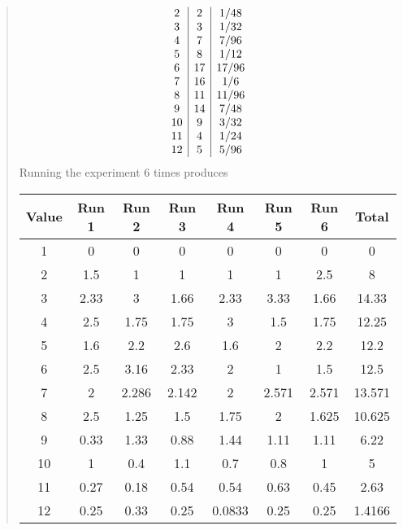 \documentclass{hw}
\begin{document}
\begin{enumerate}
\begin{quote}
\[\begin{array}{c | c | c}
2 & 2 & {1/48}\\

3 & 3 & {1/32}\\

4 & 7 & {7/96}\\

5 & 8 & {1/12}\\

6 & 17 & {17/96}\\

7 & 16 & {1/6}\\

8 & 11 & {11/96}\\

9 & 14 & {7/48}\\

10 & 9 & {3/ 32}\\

11 & 4 & {1/ 24}\\

12 & 5 & {5/96}\\
\end{array}
\]
Running the experiment 6 times produces
\begin{center}
\begin{tabular}{c | c | c | c | c | c | c | c}
Value & Run 1 & Run 2 & Run 3 & Run 4 & Run 5 & Run 6 & Total\\
\hline
1 & 0 & 0 & 0 & 0 & 0 & 0 & 0\\
2 & 1.5 & 1 & 1 & 1 & 1 & 2.5 & 8\\
3 & 2.33 & 3 & 1.66 & 2.33 & 3.33 & 1.66 & 14.33\\
4 & 2.5 & 1.75 & 1.75 & 3 & 1.5 & 1.75 & 12.25\\
5 & 1.6 & 2.2 & 2.6 & 1.6 & 2 & 2.2 & 12.2\\
6 & 2.5 & 3.16 & 2.33 & 2 & 1 & 1.5 & 12.5\\
7 & 2 & 2.286 & 2.142 & 2 & 2.571 & 2.571 & 13.571\\
8 & 2.5 & 1.25 & 1.5 & 1.75 & 2 & 1.625 & 10.625\\
9 & 0.33 & 1.33 & 0.88 & 1.44 & 1.11 & 1.11 & 6.22\\
10 & 1 & 0.4 & 1.1 & 0.7 & 0.8 & 1 & 5\\
11 & 0.27 & 0.18 & 0.54 & 0.54 & 0.63 & 0.45 & 2.63\\
12 & 0.25 & 0.33 & 0.25 & 0.0833 & 0.25 & 0.25 & 1.4166\\
\end{tabular}
\end{center}
\end{quote}


\end{enumerate}
\end{document}
